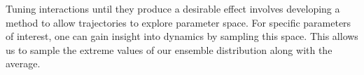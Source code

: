\documentclass[11pt]{article}
\begin{document}
Tuning interactions until they produce a desirable effect involves developing a method to allow trajectories to explore parameter space. For specific parameters of interest, one can gain insight into dynamics by sampling this space.  This allows us to sample the extreme values of our ensemble distribution along with the average.   %
\end{document}
